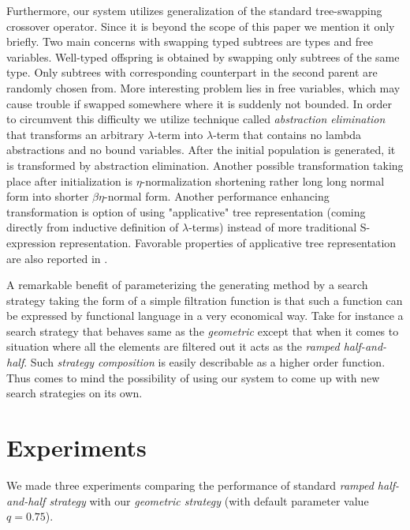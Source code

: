 \documentclass[conference]{IEEEtran}
\newcommand{\lterm}{$\lambda$-term\xspace}
\newcommand{\lterms}{$\lambda$-terms\xspace}
\begin{document}
Furthermore, our system utilizes generalization of the standard 
tree-swapping crossover operator. Since it is beyond the scope of this 
paper we mention it only briefly. Two main concerns with swapping typed 
subtrees are types and free variables. Well-typed offspring is obtained 
by swapping only subtrees of the same type. Only subtrees with 
corresponding counterpart in the second parent are randomly chosen from.
More interesting problem lies in free variables, which may cause trouble
if swapped somewhere where it is suddenly not bounded. In order to circumvent this
difficulty we utilize technique called \textit{abstraction elimination}\cite{jones87}
that transforms an arbitrary \lterm into \lterm that contains no lambda abstractions
and no bound variables. After the initial population is generated,  it is transformed
by abstraction elimination. Another possible transformation taking place
after initialization is $\eta$-normalization shortening 
rather long long normal form into shorter $\beta\eta$-normal form.  
Another performance enhancing transformation is option of using "applicative" tree representation (coming directly from inductive definition of \lterms) instead of more traditional S-expression representation. Favorable properties of applicative tree representation are also reported in \cite{yu1998polygp}. 

A remarkable benefit of parameterizing the generating method 
by a search strategy taking the form of a simple filtration function
is that such a function can be expressed by functional language in a very 
economical way. Take for instance a search strategy that behaves same
as the \textit{geometric} except that when it comes to 
situation where all the elements are filtered out it
acts as the \textit{ramped half-and-half}. 
Such \textit{strategy composition}
is easily describable as a higher order function. Thus comes 
to mind the possibility of using our system to come up with new
search strategies on its own.










\section{Experiments}
\label{experiments}

We made three experiments comparing the performance of standard 
\textit{ramped half-and-half strategy} with our
\textit{geometric strategy} (with default parameter value $q=0.75$). 
\end{document}
